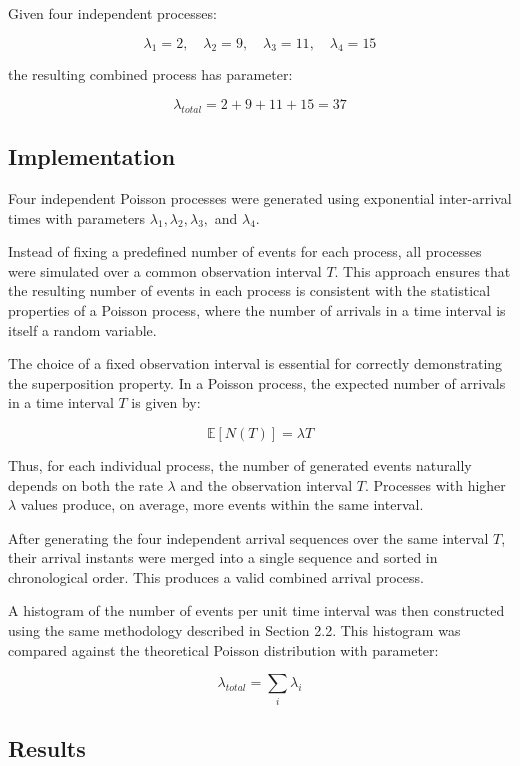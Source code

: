 \documentclass[12pt]{article}
\begin{document}
Given four independent processes:

\[
\lambda_1=2,\quad
\lambda_2=9,\quad
\lambda_3=11,\quad
\lambda_4=15
\]

the resulting combined process has parameter:

\begin{equation}
\lambda_{total}=2+9+11+15=37
\end{equation}

\subsection{Implementation}

Four independent Poisson processes were generated using exponential inter-arrival times with parameters $\lambda_1, \lambda_2, \lambda_3,$ and $\lambda_4$. 

Instead of fixing a predefined number of events for each process, all processes were simulated over a common observation interval $T$. This approach ensures that the resulting number of events in each process is consistent with the statistical properties of a Poisson process, where the number of arrivals in a time interval is itself a random variable.

The choice of a fixed observation interval is essential for correctly demonstrating the superposition property. In a Poisson process, the expected number of arrivals in a time interval $T$ is given by:

\[
\mathbb{E}[N(T)] = \lambda T
\]

Thus, for each individual process, the number of generated events naturally depends on both the rate $\lambda$ and the observation interval $T$. Processes with higher $\lambda$ values produce, on average, more events within the same interval.

After generating the four independent arrival sequences over the same interval $T$, their arrival instants were merged into a single sequence and sorted in chronological order. This produces a valid combined arrival process.

A histogram of the number of events per unit time interval was then constructed using the same methodology described in Section 2.2. This histogram was compared against the theoretical Poisson distribution with parameter:

\[
\lambda_{total} = \sum_i \lambda_i
\]

\subsection{Results}
\end{document}
